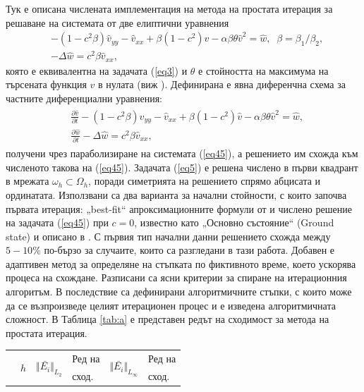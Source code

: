 \documentclass[a5paper]{article}
\newcommand{\rf}[1]{(\ref{#1})}
\theoremstyle{remark}
\begin{document}
\begin{large}
Тук е описана числената имплементация на метода на простата итерация за решаване на системата от две елиптични уравнения \begin{equation}\label{eq45}
\begin{split}
 &- (1 - c^2 \beta) \widehat{v}_{yy} -\widehat{v}_{xx} + \beta (1-c^2) \widehat{v} - \alpha \beta \theta \widehat{v}^2 = \widehat{w}, \; \; \beta = \beta_1/\beta_2, \\
 &- \Delta \widehat{w} =  c^2 \beta \widehat{v}_{xx},
\end{split}
\end{equation}
която е еквивалентна на задачата \rf{eq3} и $\theta$ е стойността на максимума на търсената функция $v$ в нулата (виж \cite{ref16}). Дефинирана е явна диференчна схема за частните диференциални уравнения:
\begin{align}\label{eq5}
\begin{split}
 &\frac {\partial \widehat{v}}{\partial t} - (1 - c^2 \beta) \widehat{v}_{yy} -\widehat{v}_{xx} + \beta (1-c^2) \widehat{v} - \alpha \beta \theta \widehat{v}^2 = \widehat{w}, \\
 &\frac {\partial \widehat{w}}{\partial t} - \Delta \widehat{w} =  c^2 \beta \widehat{v}_{xx},
\end{split}
\end{align}
получени чрез параболизиране на системата \rf{eq45}, а решението им схожда към численото такова на \rf{eq45}. Задачата \rf{eq5} е решена числено в първи квадрант в мрежата $\omega_h \subset \Omega_h$, поради симетрията на решението спрямо абцисата и ординатата. Използвани са два варианта за начални стойности, с които започва първата итерация: „best-fit“ апроксимационните формули от \cite{ref15} и числено решение на задачата \rf{eq45} при $c=0$, известно като „Основно състояние“ (Ground state) и описано в \cite{ref1c0, ref2c0}. С първия тип начални данни решението схожда между $5-10\%$ по-бързо за случаите, които са разгледани в тази работа. Добавен е адаптивен метод за определяне на стъпката по фиктивното време, което ускорява процеса на схождане. Разписани са ясни критерии за спиране на итерационния алгоритъм. В последствие са дефинирани алгоритмичните стъпки, с които може да се възпроизведе целият итерационен процес и е изведена алгоритмичната сложност. В Таблица \ref{tab:a} е представен редът на сходимост за метода на простата итерация.

\begin{table}[ht]
\begin{small}
\centering
		\begin{tabular}{||c|l|ll|ll||}
			\hline
			\hline
      \multirow{2  }{*}{ }        & \multirow{2  }{*}{$h$}  &  	\multirow{2  }{*}{ $\Vert \bar{ E_i} \Vert_{L_2}$ }	&Ред на	& \multirow{2  }{*}{ $\Vert \bar{ E_i} \Vert_{L_\infty}$ } 		&Ред на   \\
	                                        &                                                & 							 					&  сход. 	& 								       					& сход. \\
   					\hline 
					\hline 


\end{tabular}
\end{small}
\end{table}
\end{large}
\end{document}
